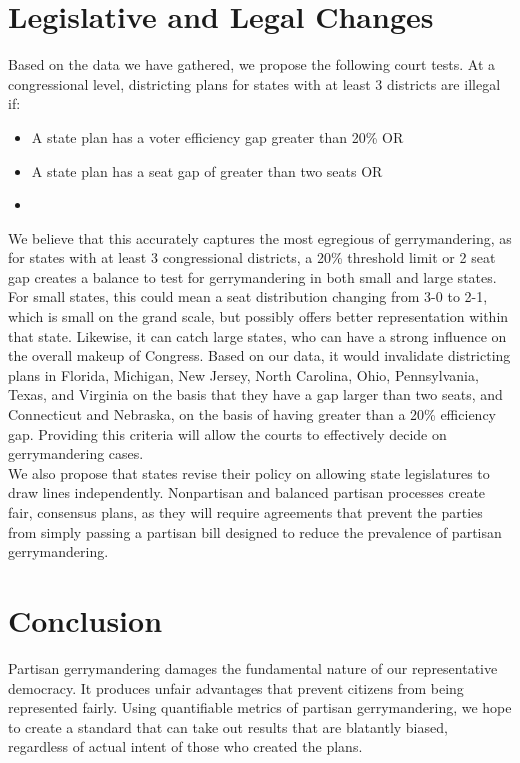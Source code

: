 \documentclass[12pt]{article}
\begin{document}
  \section{Legislative and Legal Changes}
  
  Based on the data we have gathered, we propose the following court tests.  At a congressional level, districting plans for states with at least 3 districts are illegal if:
  \begin{itemize}
  \item A state plan has a voter efficiency gap greater than 20\% OR
  \item A state plan has a seat gap of greater than two seats OR
  \item%
  \end{itemize}
  
  We believe that this accurately captures the most egregious of gerrymandering, as for states with at least 3 congressional districts, a 20\% threshold limit or 2 seat gap creates a balance to test for gerrymandering in both small and large states.  For small states, this could mean a seat distribution changing from 3-0 to 2-1, which is small on the grand scale, but possibly offers better representation within that state. Likewise, it can catch large states, who can have a strong influence on the overall makeup of Congress.  Based on our data, it would invalidate districting plans in Florida, Michigan, New Jersey, North Carolina, Ohio, Pennsylvania, Texas, and Virginia on the basis that they have a gap larger than two seats, and Connecticut and Nebraska, on the basis of having greater than a 20\% efficiency gap. Providing this criteria will allow the courts to effectively decide on gerrymandering cases.\\

  We also propose that states revise their policy on allowing state legislatures to draw lines independently.  Nonpartisan and balanced partisan processes create fair, consensus plans, as they will require agreements that prevent the parties from simply passing a partisan bill designed to reduce the prevalence of partisan gerrymandering.  
  
  \section{Conclusion}
  Partisan gerrymandering damages the fundamental nature of our representative democracy.  It produces unfair advantages that prevent citizens from being represented fairly.  Using quantifiable metrics of partisan gerrymandering, we hope to create a standard that can take out results that are blatantly biased, regardless of actual intent of those who created the plans.
  
  \singlespacing{}

  \printbibliography{}
\end{document}
